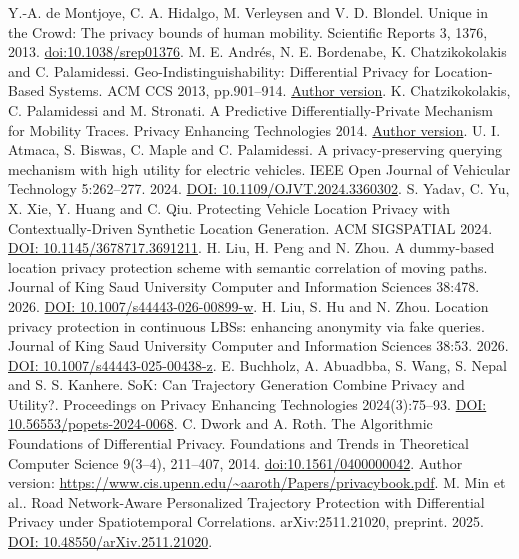  Y.-A. de Montjoye, C. A. Hidalgo, M. Verleysen and V. D. Blondel. Unique in the Crowd: The privacy bounds of human mobility. Scientific Reports 3, 1376, 2013. \href{https://doi.org/10.1038/srep01376}{doi:10.1038/srep01376}.
 M. E. Andrés, N. E. Bordenabe, K. Chatzikokolakis and C. Palamidessi. Geo-Indistinguishability: Differential Privacy for Location-Based Systems. ACM CCS 2013, pp.901--914. \href{https://arxiv.org/abs/1212.1984}{Author version}.
 K. Chatzikokolakis, C. Palamidessi and M. Stronati. A Predictive Differentially-Private Mechanism for Mobility Traces. Privacy Enhancing Technologies 2014. \href{https://petsymposium.org/2014/papers/Chatzikokolakis.pdf}{Author version}.
 U. I. Atmaca, S. Biswas, C. Maple and C. Palamidessi. A privacy-preserving querying mechanism with high utility for electric vehicles. IEEE Open Journal of Vehicular Technology 5:262--277. 2024. \href{https://wrap.warwick.ac.uk/id/eprint/183198/}{DOI: 10.1109/OJVT.2024.3360302}.
 S. Yadav, C. Yu, X. Xie, Y. Huang and C. Qiu. Protecting Vehicle Location Privacy with Contextually-Driven Synthetic Location Generation. ACM SIGSPATIAL 2024. \href{https://arxiv.org/abs/2409.09495}{DOI: 10.1145/3678717.3691211}.
 H. Liu, H. Peng and N. Zhou. A dummy-based location privacy protection scheme with semantic correlation of moving paths. Journal of King Saud University Computer and Information Sciences 38:478. 2026. \href{https://link.springer.com/article/10.1007/s44443-026-00899-w}{DOI: 10.1007/s44443-026-00899-w}.
 H. Liu, S. Hu and N. Zhou. Location privacy protection in continuous LBSs: enhancing anonymity via fake queries. Journal of King Saud University Computer and Information Sciences 38:53. 2026. \href{https://link.springer.com/article/10.1007/s44443-025-00438-z}{DOI: 10.1007/s44443-025-00438-z}.
 E. Buchholz, A. Abuadbba, S. Wang, S. Nepal and S. S. Kanhere. SoK: Can Trajectory Generation Combine Privacy and Utility?. Proceedings on Privacy Enhancing Technologies 2024(3):75--93. \href{https://petsymposium.org/popets/2024/popets-2024-0068.pdf}{DOI: 10.56553/popets-2024-0068}.
 C. Dwork and A. Roth. The Algorithmic Foundations of Differential Privacy. Foundations and Trends in Theoretical Computer Science 9(3--4), 211--407, 2014. \href{https://doi.org/10.1561/0400000042}{doi:10.1561/0400000042}. Author version: \url{https://www.cis.upenn.edu/~aaroth/Papers/privacybook.pdf}.
 M. Min et al.. Road Network-Aware Personalized Trajectory Protection with Differential Privacy under Spatiotemporal Correlations. arXiv:2511.21020, preprint. 2025. \href{https://arxiv.org/abs/2511.21020}{DOI: 10.48550/arXiv.2511.21020}.
